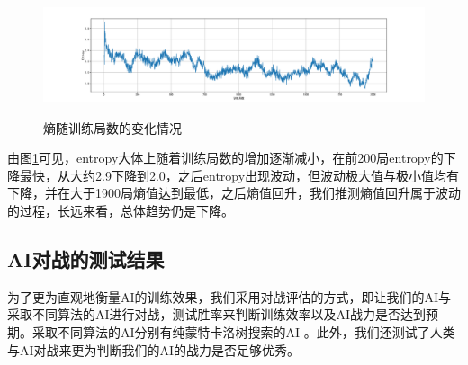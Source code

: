 \documentclass[c5size]{ctexart}
\begin{document}
		\begin{figure}
			\caption{熵随训练局数的变化情况}
			\includegraphics[scale=0.4]{Entropy.pdf}
			\label{fig:Entropy}
		\end{figure}
		由图\ref{fig:Entropy}可见，entropy大体上随着训练局数的增加逐渐减小，在前200局entropy的下降最快，从大约2.9下降到2.0，之后entropy出现波动，但波动极大值与极小值均有下降，并在大于1900局熵值达到最低，之后熵值回升，我们推测熵值回升属于波动的过程，长远来看，总体趋势仍是下降。
		
	\subsection{AI对战的测试结果}
		为了更为直观地衡量AI的训练效果，我们采用对战评估的方式，即让我们的AI与采取不同算法的AI进行对战，测试胜率来判断训练效率以及AI战力是否达到预期。采取不同算法的AI分别有纯蒙特卡洛树搜索的AI 。此外，我们还测试了人类与AI对战来更为判断我们的AI的战力是否足够优秀。
\end{document}
